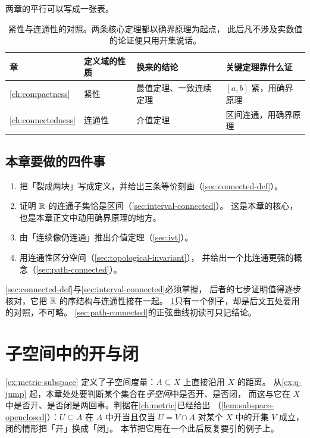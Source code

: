 两章的平行可以写成一张表。

\begin{table}[htbp]
  \centering
  \caption{紧性与连通性的对照。两条核心定理都以确界原理为起点，
    此后凡不涉及实数值的论证便只用开集说话。}
  \label{tab:compact-vs-connected}
  \begin{tabular}{@{}llll@{}}
    \toprule
    章 & 定义域的性质 & 换来的结论 & 关键定理靠什么证 \\
    \midrule
    \ref{ch:compactness} & 紧性 & 最值定理、一致连续定理 & \([a,b]\) 紧，用确界原理 \\
    \ref{ch:connectedness} & 连通性 & 介值定理 & 区间连通，用确界原理 \\
    \bottomrule
  \end{tabular}
\end{table}

\subsection*{本章要做的四件事}

\begin{enumerate}[label=(\arabic*), leftmargin=1.8em]
  \item 把「裂成两块」写成定义，并给出三条等价刻画（\cref{sec:connected-def}）。
  \item 证明 \(\mathbb{R}\) 的连通子集恰是区间（\cref{sec:interval-connected}）。
        这是本章的核心，也是本章正文中动用确界原理的地方。
  \item 由「连续像仍连通」推出介值定理（\cref{sec:ivt}）。
  \item 用连通性区分空间（\cref{sec:topological-invariant}），
        并给出一个比连通更强的概念（\cref{sec:path-connected}）。
\end{enumerate}

\begin{remark}[读法建议]
  \cref{sec:connected-def}与\cref{sec:interval-connected}必须掌握，
  后者的七步证明值得逐步核对，它把 \(\mathbb{R}\) 的序结构与连通性接在一起。
  \cref{sec:subspace-openclosed}只有一个例子，却是后文五处要用的对照，不可略。
  \cref{sec:path-connected}的正弦曲线初读可只记结论。
\end{remark}

\section{子空间中的开与闭}
\label{sec:subspace-openclosed}

\cref{ex:metric-subspace} 定义了子空间度量：\(A \subseteq X\) 上直接沿用 \(X\) 的距离。
从\cref{ex:q-jump} 起，本章处处要判断某个集合在\emph{子空间}中是否开、是否闭，
而这与它在 \(X\) 中是否开、是否闭是两回事。判据在\cref{ch:metric}已经给出
（\cref{lem:subspace-openclosed}）：\(U \subseteq A\) 在 \(A\) 中开当且仅当
\(U = V \cap A\) 对某个 \(X\) 中的开集 \(V\) 成立，闭的情形把「开」换成「闭」。
本节把它用在一个此后反复要引的例子上。

